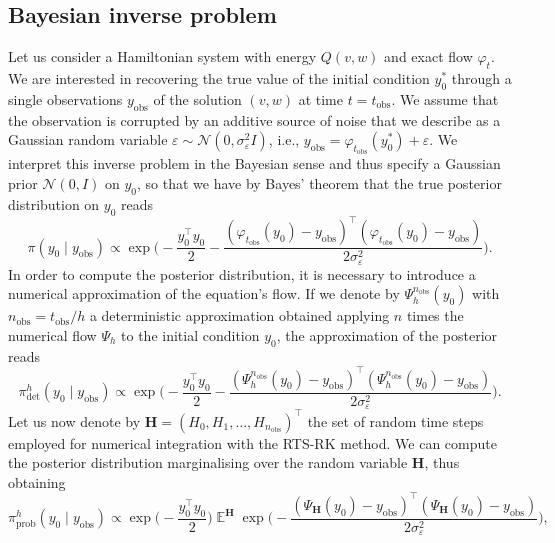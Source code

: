 \documentclass{siamart1116}
\numberwithin{theorem}{section}
\renewcommand{\phi}{\varphi}
\newcommand{\epl}{\varepsilon}
\newcommand{\E}{\operatorname{\mathbb{E}}}
\newcommand{\corr}[1]{{\color{red}#1}}
\begin{document}
\subsection{Bayesian inverse problem} Let us consider a Hamiltonian system with energy \corr{$Q(v,w)$} and exact flow $\phi_t$. We are interested in recovering the true value of the initial condition $y_0^*$ through a single observations $y_{\mathrm{obs}}$ of the solution \corr{$(v, w)$} at time $t = t_{\mathrm{obs}}$. \corr{We assume that} the observation is corrupted by an additive source \corr{of noise that we describe as a Gaussian random variable}  $\epl \sim \mathcal{N}(0, \sigma_\epl^2 I)$, i.e., $y_{\mathrm{obs}} = \phi_{t_{\mathrm{obs}}}(y_0^*) + \epl$. We interpret this inverse problem in the Bayesian sense and thus specify a Gaussian prior $\mathcal{N}(0, I)$ on $y_0$, so that we have by Bayes' theorem that the true posterior distribution on $y_0$ reads
\begin{equation}\label{eq:PosteriorExact}
	\pi(y_0 \mid y_{\mathrm{obs}}) \propto \exp\Big(-\frac{y_0^\top y_0}{2} -\frac{(\phi_{t_{\mathrm{obs}}}(y_0) - y_{\mathrm{obs}})^\top(\phi_{t_{\mathrm{obs}}}(y_0) - y_{\mathrm{obs}})}{2\sigma_\epl^2}\Big).
\end{equation}
In order to compute the posterior distribution, it is necessary to introduce a numerical approximation of the equation's flow. If we denote by $\Psi_h^{n_{\mathrm{obs}}}(y_0)$ with $n_{\mathrm{obs}} = t_{\mathrm{obs}} / h$ a deterministic approximation obtained applying $n$ times the numerical flow $\Psi_h$ to the initial condition $y_0$, the approximation of the posterior reads
\begin{equation}\label{eq:PosteriorDet}
	\pi^h_{\mathrm{det}}(y_0 \mid y_{\mathrm{obs}}) \propto \exp\Big(-\frac{y_0^\top y_0}{2} -\frac{(\Psi_h^{n_{\mathrm{obs}}}(y_0) - y_{\mathrm{obs}})^\top(\Psi_h^{n_{\mathrm{obs}}}(y_0) - y_{\mathrm{obs}})}{2\sigma_\epl^2}\Big).
\end{equation}
Let us now denote by $\mathbf{H} = (H_0, H_1, \ldots, H_{n_\mathrm{obs}})^\top$ the set of random time steps employed for numerical integration with the RTS-RK method. We can compute the posterior distribution marginalising over the random variable $\mathbf{H}$, thus obtaining
\begin{equation}\label{eq:PosteriorProb}
	\pi^h_{\mathrm{prob}}(y_0 \mid y_{\mathrm{obs}}) \propto \exp\Big(-\frac{y_0^\top y_0}{2}\Big) \E^{\mathbf{H}} \exp\Big(-\frac{(\Psi_\mathbf{H}(y_0) - y_{\mathrm{obs}})^\top(\Psi_\mathbf{H}(y_0) - y_{\mathrm{obs}})}{2\sigma_\epl^2}\Big),
\end{equation}
\end{document}
